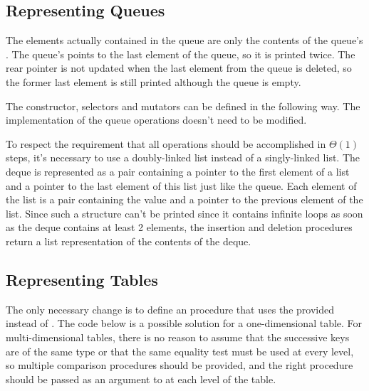 \subsection{Representing Queues}

\begin{exe}[3.21]
    The elements actually contained in the queue are only the contents of the 
    queue’s . The queue’s  points to the last element of the 
    queue, so it is printed twice. The rear pointer is not updated when the last 
    element from the queue is deleted, so the former last element is still 
    printed although the queue is empty.
\end{exe}

\begin{exe}[3.22]
    The constructor, selectors and mutators can be defined in the following way. 
    The implementation of the queue operations doesn’t need to be modified.
\end{exe}

\begin{exe}[3.23]
    To respect the requirement that all operations should be accomplished in 
    $\Theta(1)$ steps, it’s necessary to use a doubly-linked list instead of 
    a singly-linked list. The deque is represented as a pair containing 
    a pointer to the first element of a list and a pointer to the last element 
    of this list just like the queue. Each element of the list is a pair 
    containing the value and a pointer to the previous element of the list. 
    Since such a structure can’t be printed since it contains infinite loops as 
    soon as the deque contains at least 2 elements, the insertion and deletion 
    procedures return a list representation of the contents of the deque.
\end{exe}

\subsection{Representing Tables}

\begin{exe}[3.24]
    The only necessary change is to define an  procedure that uses 
    the provided  instead of . The code below is 
    a possible solution for a one-dimensional table. For multi-dimensional 
    tables, there is no reason to assume that the successive keys are of the 
    same type or that the same equality test must be used at every level, so 
    multiple comparison procedures should be provided, and the right procedure 
    should be passed as an argument to  at each level of the table.
\end{exe}

